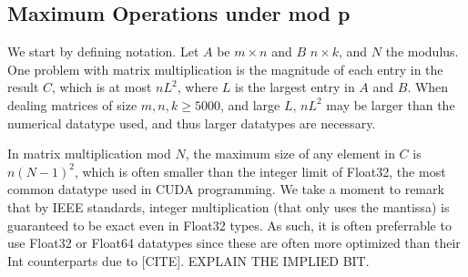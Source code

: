 
\subsection{Maximum Operations under mod p}

We start by defining notation. Let $A$ be $m \times n$ and $B$ $n \times k$, and $N$ the modulus. One problem with matrix multiplication is the magnitude of each entry in the result $C$, which is at most $n L^2$, where $L$ is the largest entry in $A$ and $B$. When dealing matrices of size $m,n,k \geq 5000$, and large $L$, $n L^2$ may be larger than the numerical datatype used, and thus larger datatypes are necessary. 

In matrix multiplication mod $N$, the maximum size of any element in $C$ is $n (N-1)^2$, which is often smaller than the integer limit of Float32, the most common datatype used in CUDA programming. We take a moment to remark that by IEEE standards, integer multiplication (that only uses the mantissa) is guaranteed to be exact even in Float32 types. As such, it is often preferrable to use Float32 or Float64 datatypes since these are often more optimized than their Int counterparts due to [CITE]. EXPLAIN THE IMPLIED BIT.

